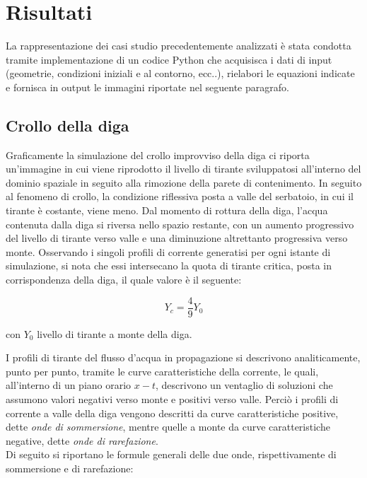 \documentclass[12pt]{article} %
\begin{document}
\newpage

\section {Risultati}

\noindent La rappresentazione dei casi studio precedentemente analizzati è stata condotta tramite implementazione di un codice Python che acquisisca i dati di input (geometrie, condizioni iniziali e al contorno, ecc..), rielabori le equazioni indicate e fornisca in output le immagini riportate nel seguente paragrafo.

\subsection{Crollo della diga}

\noindent Graficamente la simulazione del crollo improvviso della diga ci riporta un'immagine in cui viene riprodotto il livello di tirante sviluppatosi all'interno del dominio spaziale in seguito alla rimozione della parete di contenimento. 
In seguito al fenomeno di crollo, la condizione riflessiva posta a valle del serbatoio, in cui il tirante è costante, viene meno.
Dal momento di rottura della diga, l'acqua contenuta dalla diga si riversa nello spazio restante, con un aumento progressivo del livello di tirante verso valle e una diminuzione altrettanto progressiva verso monte. Osservando i singoli profili di corrente generatisi per ogni istante di simulazione, si nota che essi intersecano la quota di tirante critica, posta in corrispondenza della diga, il quale valore è il seguente:

\begin{equation}
    Y_c=\frac{4}{9}Y_0
\end{equation}

\noindent con $Y_0$ livello di tirante a monte della diga.

\noindent I profili di tirante del flusso d'acqua in propagazione si descrivono analiticamente, punto per punto, tramite le curve caratteristiche della corrente, le quali, all'interno di un piano orario $x-t$, descrivono un ventaglio di soluzioni che assumono valori negativi verso monte e positivi verso valle. Perciò i profili di corrente a valle della diga vengono descritti da curve caratteristiche positive, dette \textit{onde di sommersione}, mentre quelle a monte da curve caratteristiche negative, dette \textit{onde di rarefazione}.\\
Di seguito si riportano le formule generali delle due onde, rispettivamente di sommersione e di rarefazione:
\end{document}
